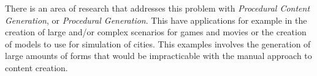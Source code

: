 There is an area of research that addresses this problem with \emph{Procedural Content Generation}, or \emph{Procedural Generation}. This have applications for example in the creation of large and/or complex scenarios for games and movies or the creation of models to use for simulation of cities. This examples involves the generation of large amounts of forms that would be impracticable with the manual approach to content creation.





